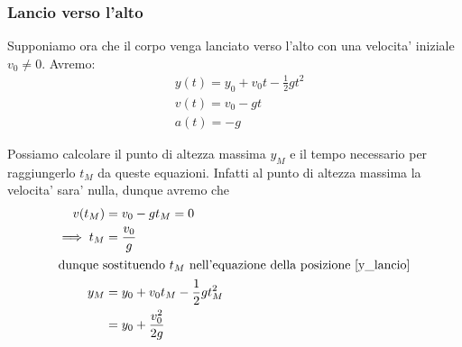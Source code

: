 \subsubsection{Lancio verso l'alto}
Supponiamo ora che il corpo venga lanciato verso l'alto con una velocita' iniziale $v_0 \neq 0$.
Avremo:
\begin{subequations}
\begin{align}
    &y(t) = y_0 + v_0t - \frac{1}{2}gt^2 \label{y_lancio}\\
    &v(t) = v_0 - gt \\
    &a(t) = -g
\end{align}    
\end{subequations}

Possiamo calcolare il punto di altezza massima $y_M$ e il tempo necessario per raggiungerlo $t_M$ da queste equazioni.
Infatti al punto di altezza massima la velocita' sara' nulla, dunque avremo che    
\begin{alignat}
    {2}
          v(t_M) &= v_0 - gt_M = 0       \nonumber \\
    \implies t_M &= \frac{v_0}{g}               \\
    \intertext{dunque sostituendo $t_M$ nell'equazione della posizione \ref{y_lancio}}
    y_M     &= y_0 + v_0t_M - \frac{1}{2}gt_M^2 \nonumber \\
            &= y_0 + \frac{v_0^2}{2g}               
\end{alignat}

